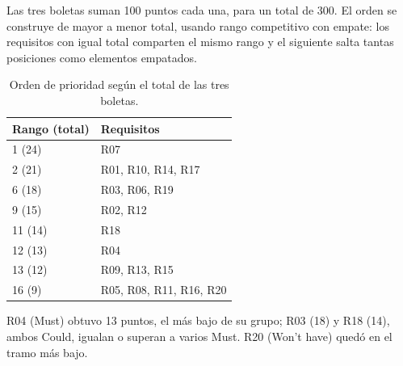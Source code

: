 ﻿Las tres boletas suman 100 puntos cada una, para un total de 300. El orden se construye de mayor a menor total, usando rango competitivo con empate: los requisitos con igual total comparten el mismo rango y el siguiente salta tantas posiciones como elementos empatados.

\begin{table}[htbp]
\centering
\footnotesize
\caption{Orden de prioridad según el total de las tres boletas.}
\label{tab:ranking_votacion}
\begin{tabular}{@{}ll@{}}
\toprule
Rango (total) & Requisitos \\
\midrule
1 (24) & R07 \\
2 (21) & R01, R10, R14, R17 \\
6 (18) & R03, R06, R19 \\
9 (15) & R02, R12 \\
11 (14) & R18 \\
12 (13) & R04 \\
13 (12) & R09, R13, R15 \\
16 (9) & R05, R08, R11, R16, R20 \\
\bottomrule
\end{tabular}
\end{table}

R04 (Must) obtuvo 13 puntos, el más bajo de su grupo; R03 (18) y R18 (14), ambos Could, igualan o superan a varios Must. R20 (Won't have) quedó en el tramo más bajo.

